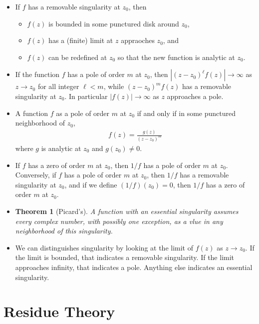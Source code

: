 \documentclass[10pt]{article}
\newtheorem{theorem}[lemma]{Theorem}
\newcommand{\ra}{\rightarrow}
\begin{document}
\begin{itemize}
    \item If $f$ has a removable singularity at $z_0$, then
    \begin{itemize}
      \item $f(z)$ is bounded in some punctured disk around $z_0$,
      \item $f(z)$ has a (finite) limit at $z$ appraoches $z_0$, and 
      \item $f(z)$ can be redefined at $z_0$ so that the new function is analytic at $z_0$.
    \end{itemize}

    \item If the function $f$ has a pole of order $m$ at $z_0$, then $|(z-z_0)^\ell f(z)| \ra \infty$ as $z \ra z_0$ for all integer $\ell < m$, while $(z-z_0)^m f(z)$ has a removable singularity at $z_0$. In particular $|f(z)| \ra \infty$ as $z$ approaches a pole.

    \item A function $f$ as a pole of order $m$ at $z_0$ if and only if in some punctured neighborhood of $z_0$,
    \begin{align*}
      f(z) = \frac{g(z)}{(z-z_0)^m}
    \end{align*}
    where $g$ is analytic at $z_0$ and $g(z_0) \neq 0$.

    \item If $f$ has a zero of order $m$ at $z_0$, then $1/f$ has a pole of order $m$ at $z_0$. Conversely, if $f$ has a pole of order $m$ at $z_0$, then $1/f$ has a removable singularity at $z_0$, and if we define $(1/f)(z_0) = 0$, then $1/f$ has a zero of order $m$ at $z_0$.

    \item \begin{theorem}[Picard's] A function with an essential singularity assumes every complex number, with possibly one exception, as a vlue in any neighborhood of this singularity.
    \end{theorem}

    \item We can distinguishes singularity by looking at the limit of $f(z)$ as $z \ra z_0$. If the limit is bounded, that indicates a removable singularity. If the limit approaches infinity, that indicates a pole. Anything else indicates an essential singularity.    
  \end{itemize}


  \section{Residue Theory} %
  \label{sec:residue_theory}
  
\end{document}
